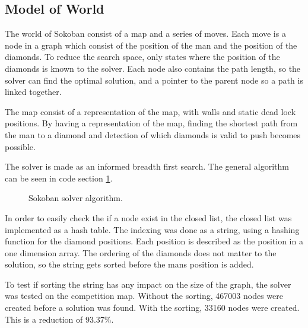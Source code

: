 \subsection{Model of World}
The world of Sokoban consist of a map and a series of moves.
Each move is a node in a graph which consist of the position of the man and the position of the diamonds.
To reduce the search space, only states where the position of the diamonds is known to the solver.
Each node also contains the path length, so the solver can find the optimal solution, and a pointer to the parent node so a path is linked together.

The map consist of a representation of the map, with walls and static dead lock positions.
By having a representation of the map, finding the shortest path from the man to a diamond and detection of which diamonds is valid to push becomes possible.

The solver is made as an informed breadth first search.
The general algorithm can be seen in code section \ref{code:sokoban_solver}.

\begin{figure}[h]
\centering
{}
 \caption{Sokoban solver algorithm.}
 \label{code:sokoban_solver}
\end{figure}

In order to easily check the if a node exist in the closed list, the closed list was implemented as a hash table.
The indexing was done as a string, using a hashing function for the diamond positions.
Each position is described as the position in a one dimension array.
The ordering of the diamonds does not matter to the solution, so the string gets sorted before the mans position is added.

To test if sorting the string has any impact on the size of the graph, the solver was tested on the competition map.
Without the sorting, 467003 nodes were created before a solution was found.
With the sorting, 33160 nodes were created. 
This is a reduction of 93.37\%.

